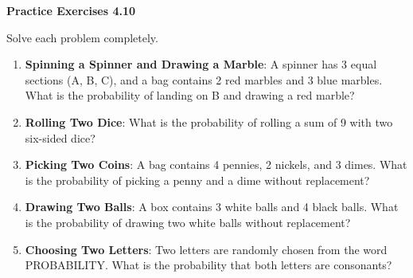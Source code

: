  \vspace{0.3ex}
\noindent\textbf{Practice Exercises 4.10}

\vspace{0.2ex}


Solve each problem completely.
\begin{enumerate}[noitemsep, label = \color{blue}\arabic*. ]
				
    
    
    
    
    
    \item \textbf{Spinning a Spinner and Drawing a Marble}: A spinner has 3 equal sections (A, B, C), and a bag contains 2 red marbles and 3 blue marbles. What is the probability of landing on B and drawing a red marble? 
    
    \item \textbf{Rolling Two Dice}: What is the probability of rolling a sum of 9 with two six-sided dice? 
    
    \item \textbf{Picking Two Coins}: A bag contains 4 pennies, 2 nickels, and 3 dimes. What is the probability of picking a penny and a dime without replacement? 
    
    \item \textbf{Drawing Two Balls}: A box contains 3 white balls and 4 black balls. What is the probability of drawing two white balls without replacement? 
    
    \item \textbf{Choosing Two Letters}: Two letters are randomly chosen from the word PROBABILITY. What is the probability that both letters are consonants? 
\end{enumerate}

